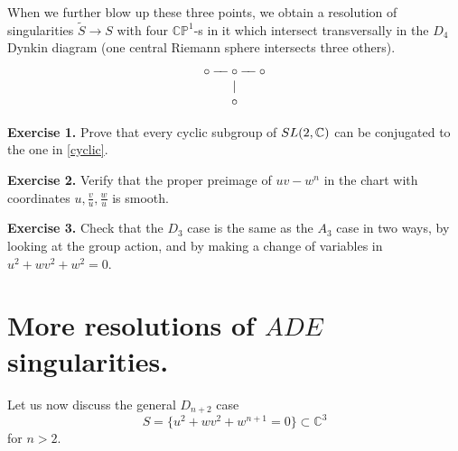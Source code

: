 \documentclass[11pt]{article}
\numberwithin{equation}{section}
\numberwithin{footnote}{section}
\newcommand{\C}{{\mathbb C}}
\newcommand{\CP}{{\mathbb C \mathbb P}}
\begin{document}

\noindent
When we further blow up these three points, we obtain a resolution of singularities $\tilde S\to S$ with four $\CP^1$-s in it which intersect transversally in the $D_4$ Dynkin diagram (one central Riemann sphere intersects three others).
\begin{align*}
\begin{array}{c}
\circ - \hskip -5pt - \circ - \hskip -5pt - \circ \\
\vert \\
\circ 
\end{array}
\end{align*}



{\bf Exercise 1.} Prove that every cyclic subgroup of ${\rm SL}(2,\C)$ can be conjugated to the one in \eqref{cyclic}. 

{\bf Exercise 2.} Verify that the proper preimage of $uv-w^n$ in the chart with coordinates $u, \frac vu, \frac wu$ is smooth.

{\bf Exercise 3.} Check that the $D_3$ case is the same as the $A_3$ case in two ways, by looking at the group action, and by
making a change of variables in $u^2 + w v^2 + w^2=0$. 


\section{More resolutions of $ADE$ singularities.}
Let us now discuss the general $D_{n+2}$ case 
$$
S=\{u^2+ wv^2 + w^{n+1} = 0\}\subset \C^3
$$
for $n>2$.
\end{document}
